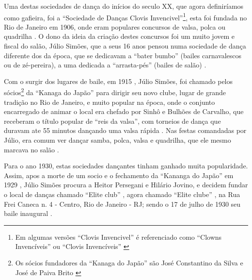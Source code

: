 Uma destas sociedades de dança do inícios do seculo XX, que agora definiríamos como gafieira, 
foi a ``Sociedade de Danças Clovis Invencivel''\footnote{Em algumas versões 
``Clovis Invencivel'' é referenciado como ``Clowns Invencíveis'' \cite[pp. 3 - cad. 3]{juliosimoes} ou 
``Clovis Invencíveis'' \cite[pp. 10]{simoesjournalbrasil1}}, 
esta foi fundada no Rio de Janeiro em 1906, 
onde eram populares concursos de valsa, polca ou quadrilha \cite[pp. 6 - cad. B]{entrevistajuliojournalbrasil1}.
O dono da ideia da criação destes concursos foi um muito jovem e fiscal do salão, Júlio Simões,
que a seus 16 anos pensou numa sociedade de dança diferente dos da época,
que se dedicavam a ``bater bumbo'' (bailes carnavalescos ou de zé-pereira), 
a uma dedicada a ``arrasta-pés'' (bailes de salão) 
\cite[pp. 6 - cad. B]{entrevistajuliojournalbrasil1} \cite[pp. 3 - cad. 3]{juliosimoes} \cite[pp. 10]{simoesjournalbrasil1}.

Com o surgir dos lugares de baile, em 1915 \cite[pp. 1 - cad. B]{gafieira2000reis},  
Júlio Simões, foi chamado pelos sócios\footnote{Os 
sócios fundadores da ``Kanaga do Japão'' são José Constantino da Silva 
e José de Paiva Brito \cite[pp. 1 - cad. B]{gafieira2000reis}} da ``Kanaga do Japão'' para dirigir seu novo clube,
lugar de grande tradição no Rio de Janeiro, e muito popular na época,
onde o conjunto encarregado de animar o local era chefado por Sinhô e Bulhões de Carvalho,
que receberam o título popular de ``reis da valsa'',
com torneios de dança que duravam ate 55 
minutos dançando uma valsa rápida \cite[pp. 3 - cad. 3]{juliosimoes} \cite[pp. 1 - cad. B]{gafieira2000reis} \cite[pp. 6 - cad. B]{entrevistajuliojournalbrasil1}.
Nas festas comandadas por Júlio, era comum ver dançar samba, polca, 
valsa e quadrilha, que ele mesmo marcava no salão \cite[pp. 1 - cad. B]{gafieira2000reis}. 


Para o ano 1930, estas sociedades dançantes tinham ganhado muita popularidade. 
Assim, apos a morte de um socio e o fechamento da ``Kananga do Japão'' 
em 1929 \cite[pp. 3 - cad. 3]{juliosimoes}  \cite[pp. 11]{eliteinaugura} \cite[pp. 1 - cad. B]{gafieira2000reis}, 
Júlio Simões procura a Heitor Persegani e  Hilário Jovino, 
e decidem fundar o local de danças chamado ``Elite club'' \cite[pp. 11]{eliteinaugura} \cite[pp. 13]{respeitojournalbrasil1},
agora chamado ``Elite clube'' \cite[pp. 3 - cad. 3]{juliosimoes},
na Rua Frei Caneca n. 4 - Centro, Rio de Janeiro - RJ;
sendo o 17 de julho de 1930 seu baile inaugural 
\cite[pp. 11]{eliteinaugura} \cite[pp. 3 - cad. 3]{juliosimoes} \cite[pp. 10]{simoesjournalbrasil1}.

